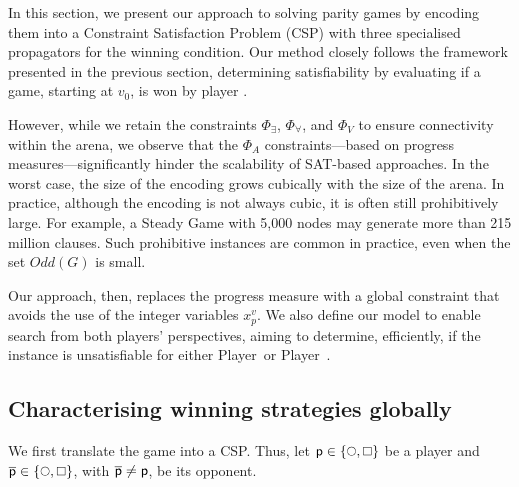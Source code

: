 \documentclass[runningheads]{llncs}
\begin{document}
In this section, we present our approach to solving parity games by encoding them into a Constraint Satisfaction Problem (CSP) with three specialised propagators for the winning condition. Our method closely follows the framework presented in the previous section, determining satisfiability by evaluating if a game, starting at $v_0$, is won by player \even.

However, while we retain the constraints $\Phi_\exists$, $\Phi_\forall$, and $\Phi_V$ to ensure connectivity within the arena, we observe that the $\Phi_A$ constraints—based on progress measures—significantly hinder the scalability of SAT-based approaches. 
In the worst case, the size of the encoding grows cubically with the size of the arena. In practice, although the encoding is not always cubic, it is often still prohibitively large. For example, a Steady Game with 5,000 nodes may generate more than 215 million clauses. Such prohibitive instances are common in practice, even when the set $\textit{Odd}(G)$ is small.

Our approach, then, replaces the progress measure with a global constraint that avoids the use of the integer variables $x_p^v$. We also define our model to enable search from both players’ perspectives, aiming to determine, efficiently, if the instance is unsatisfiable for either Player~\even or Player~\odd.

\subsection{Characterising winning strategies globally}

We first translate the game into a CSP.
%
Thus, let \( \player \in \{ \even, \odd \} \) be a player and \( \opponent \in \{ \even, \odd \} \), with \( \overline{\mathsf{p}} \neq \mathsf{p} \), be its opponent.
\end{document}
